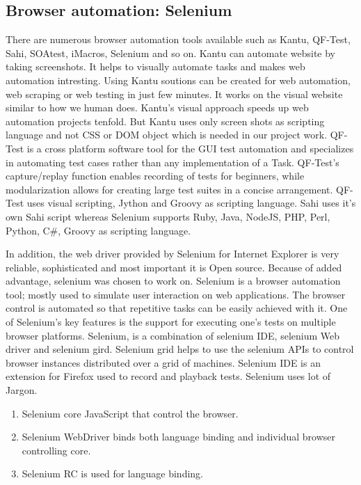 \documentclass[article,type=msc,colorback,accentcolor=tud9c,twoside,11pt]{tudthesis}
\begin{document}
	\subsection{Browser automation: Selenium}
	There are numerous browser automation tools available such as Kantu, QF-Test, Sahi, SOAtest, iMacros, Selenium and so on. Kantu can automate website by taking screenshots. It helps to visually automate tasks and makes web automation intresting. Using Kantu soutions can be created for web automation, web scraping or web testing in just few minutes. It works on the visual website similar to how we human does. Kantu's visual approach speeds up web automation projects tenfold. But
	Kantu uses only screen shots as scripting language and not CSS or DOM object which is needed in our project work. QF-Test is a cross platform software tool for the GUI test automation and specializes in automating test cases rather than any implementation of a Task. QF-Test's capture/replay function enables recording of tests for beginners, while modularization allows for creating large test suites in a concise arrangement.  QF-Test uses visual scripting, Jython and Groovy as scripting language. Sahi uses it's own Sahi script whereas Selenium supports Ruby, Java, NodeJS, PHP, Perl, Python, C\#, Groovy as scripting language. 
	
	In addition, the web driver provided by Selenium for Internet Explorer is very reliable, sophisticated and most important it is Open source. Because of added advantage, selenium was chosen to work on.
	Selenium\cite{AutomationTestingAnIntroductiontoSelenium} is a browser automation tool; mostly used to simulate user interaction on web applications. The browser control is automated so that repetitive tasks can be easily achieved with it. One of Selenium's key features is the support for executing one's tests on multiple browser platforms. Selenium,  is a combination of selenium IDE, selenium Web driver and selenium gird. Selenium grid helps to use the selenium APIs to control browser instances distributed over a grid of machines. Selenium IDE is an extension for Firefox used to record and playback tests. Selenium uses lot of Jargon.
	
	\begin{enumerate}
		\item Selenium core JavaScript that control the browser.
		\item Selenium WebDriver binds both language binding and individual browser controlling core.
		\item Selenium RC is used for language binding.
	\end{enumerate}
	
\end{document}
